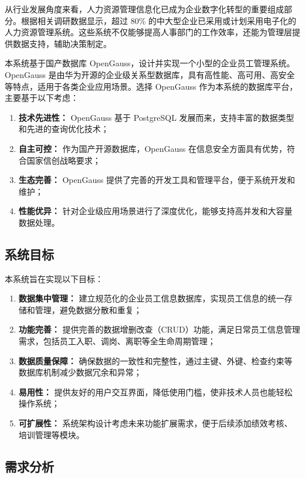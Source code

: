 \documentclass[12pt,a4paper]{article}
\begin{document}
从行业发展角度来看，人力资源管理信息化已成为企业数字化转型的重要组成部分。根据相关调研数据显示，超过 80\% 的中大型企业已采用或计划采用电子化的人力资源管理系统。这些系统不仅能够提高人事部门的工作效率，还能为管理层提供数据支持，辅助决策制定。

本系统基于国产数据库 OpenGauss，设计并实现一个小型的企业员工管理系统。OpenGauss 是由华为开源的企业级关系型数据库，具有高性能、高可用、高安全等特点，适用于各类企业应用场景。选择 OpenGauss 作为本系统的数据库平台，主要基于以下考虑：

\begin{enumerate}[label=(\arabic*)]
  \item \textbf{技术先进性：} OpenGauss 基于 PostgreSQL 发展而来，支持丰富的数据类型和先进的查询优化技术；
  \item \textbf{自主可控：} 作为国产开源数据库，OpenGauss 在信息安全方面具有优势，符合国家信创战略要求；
  \item \textbf{生态完善：} OpenGauss 提供了完善的开发工具和管理平台，便于系统开发和维护；
  \item \textbf{性能优异：} 针对企业级应用场景进行了深度优化，能够支持高并发和大容量数据处理。
\end{enumerate}

\subsection{系统目标}

本系统旨在实现以下目标：

\begin{enumerate}[label=(\arabic*)]
  \item \textbf{数据集中管理：} 建立规范化的企业员工信息数据库，实现员工信息的统一存储和管理，避免数据分散和重复；
  \item \textbf{功能完善：} 提供完善的数据增删改查（CRUD）功能，满足日常员工信息管理需求，包括员工入职、调岗、离职等全生命周期管理；
  \item \textbf{数据质量保障：} 确保数据的一致性和完整性，通过主键、外键、检查约束等数据库机制减少数据冗余和异常；
  \item \textbf{易用性：} 提供友好的用户交互界面，降低使用门槛，使非技术人员也能轻松操作系统；
  \item \textbf{可扩展性：} 系统架构设计考虑未来功能扩展需求，便于后续添加绩效考核、培训管理等模块。
\end{enumerate}

\subsection{需求分析}
\end{document}
